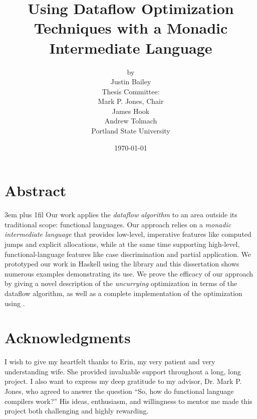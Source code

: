 \dodocclass



\date{\today}
\author{by \\ Justin Bailey \\[24pt] 
               {\normalsize Thesis Committee:} \\
               Mark P. Jones, Chair\\
               James Hook\\
               Andrew Tolmach \\[48pt] 
               Portland State University}
\title{Using Dataflow Optimization Techniques with a Monadic Intermediate Language}
\maketitle 

\pagestyle{plain}
\section*{Abstract}
{%
\parfillskip 3em plus 1fil%
Our work applies the \emph{dataflow algorithm} to an area outside its
traditional scope: functional languages. Our approach relies on
a \emph{monadic intermediate language} that provides low-level,
imperative features like computed jumps and explicit allocations,
while at the same time supporting high-level, functional-language
features like case discrimination and partial application. We
prototyped our work in Haskell using the \hoopl library and this
dissertation shows numerous examples demonstrating its use. We prove
the efficacy of our approach by giving a novel description of
the \emph{uncurrying} optimization in terms of the dataflow algorithm, as
well as a complete implementation of the optimization using \hoopl.\par}
\newpage

\section*{Acknowledgments}
I wish to give my heartfelt thanks to Erin, my very patient and very understanding
wife. She provided invaluable support throughout a long, long
project. I also want to express my deep gratitude to my advisor, Dr. Mark P. Jones, who
agreed to answer the question ``So, how do functional language compilers
work?'' His ideas, enthusiasm, and willingness to mentor me made this
project both challenging and highly rewarding. 

